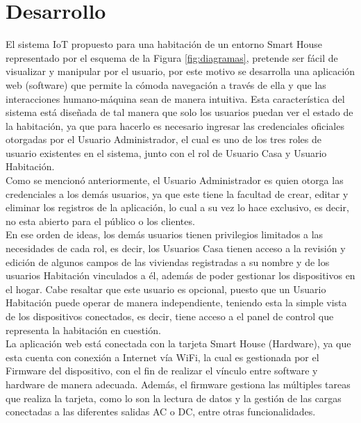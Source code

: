 \chapter{Desarrollo}

El sistema IoT propuesto para una habitación de un entorno Smart House representado por el esquema de la Figura \ref{fig:diagramas}, pretende ser fácil de visualizar y manipular por el usuario, por este motivo se desarrolla una aplicación web (software) que permite la cómoda navegación a través de ella y que las interacciones humano-máquina sean de manera intuitiva. Esta característica del sistema está diseñada de tal manera que solo los usuarios puedan ver el estado de la habitación, ya que para hacerlo es necesario ingresar las credenciales oficiales otorgadas por el Usuario Administrador, el cual es uno de los tres roles de usuario existentes en el sistema, junto con el rol de Usuario Casa y Usuario Habitación.\\

Como se mencionó anteriormente, el Usuario Administrador es quien otorga las credenciales a los demás usuarios, ya que este tiene la facultad de crear, editar y eliminar los registros de la aplicación, lo cual a su vez lo hace exclusivo, es decir, no esta abierto para el público o los clientes.\\ 

En ese orden de ideas, los demás usuarios tienen privilegios limitados a las necesidades de cada rol, es decir, los Usuarios Casa tienen acceso a la revisión y edición de algunos campos de las viviendas registradas a su nombre y de los usuarios Habitación vinculados a él, además de poder gestionar los dispositivos en el hogar. Cabe resaltar que este usuario es opcional, puesto que un Usuario Habitación puede operar de manera independiente, teniendo esta la simple vista de los dispositivos conectados, es decir, tiene acceso a el panel de control que representa la habitación en cuestión.\\
 
La aplicación web está conectada con la tarjeta Smart House (Hardware), ya que esta cuenta con conexión a Internet vía WiFi, la cual es gestionada por el Firmware del dispositivo, con el fin de realizar el vínculo entre software y hardware de manera adecuada. Además, el firmware gestiona las múltiples tareas que realiza la tarjeta, como lo son la lectura de datos y la gestión de las cargas conectadas a las diferentes salidas AC o DC, entre otras funcionalidades.\\

